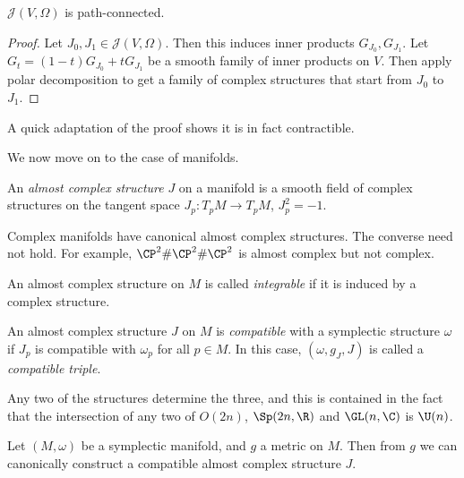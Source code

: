 \documentclass[a4paper]{article}
\begin{document}
\begin{prop}
  $\mathcal{J}(V, \Omega)$ is path-connected.
\end{prop}

\begin{proof}
  Let $J_0, J_1 \in \mathcal{J}(V, \Omega)$. Then this induces inner products $G_{J_0}, G_{J_1}$. Let $G_t = (1 - t) G_{J_0} + t G_{J_1}$ be a smooth family of inner products on $V$. Then apply polar decomposition to get a family of complex structures that start from $J_0$ to $J_1$.
\end{proof}
A quick adaptation of the proof shows it is in fact contractible.

We now move on to the case of manifolds.

\begin{defi}
  An \emph{almost complex structure} $J$ on a manifold is a smooth field of complex structures on the tangent space $J_p: T_p M \to T_p M$, $J_p^2 = -1$.
\end{defi}

\begin{eg}
  Complex manifolds have canonical almost complex structures. The converse need not hold. For example, $\CP^2 \# \CP^2 \# \CP^2$ is almost complex but not complex.
\end{eg}

\begin{defi}
  An almost complex structure on $M$ is called \emph{integrable} if it is induced by a complex structure.
\end{defi}

\begin{defi}
  An almost complex structure $J$ on $M$ is \emph{compatible} with a symplectic structure $\omega$ if $J_p$ is compatible with $\omega_p$ for all $p \in M$. In this case, $(\omega, g_J, J)$ is called a \emph{compatible triple}.
\end{defi}
Any two of the structures determine the three, and this is contained in the fact that the intersection of any two of $O(2n)$, $\Sp(2n, \R)$ and $\GL(n, \C)$ is $\U(n)$.

\begin{prop}
  Let $(M, \omega)$ be a symplectic manifold, and $g$ a metric on $M$. Then from $g$ we can canonically construct a compatible almost complex structure $J$.
\end{prop}
\end{document}
